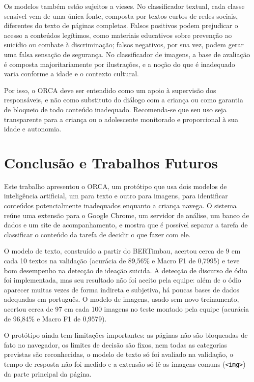\documentclass[
    12pt,           %
    oneside,        %
    a4paper,        %
    chapter=TITLE,  %
    english,        %
    brazil          %
]{abntex2}
\begin{document}
Os modelos também estão sujeitos a vieses. No classificador textual, cada
classe sensível vem de uma única fonte, composta por textos curtos de redes
sociais, diferentes do texto de páginas completas. Falsos positivos podem
prejudicar o acesso a conteúdos legítimos, como materiais educativos sobre
prevenção ao suicídio ou combate à discriminação; falsos negativos, por sua
vez, podem gerar uma falsa sensação de segurança. No classificador de imagens,
a base de avaliação é composta majoritariamente por ilustrações, e a noção do
que é inadequado varia conforme a idade e o contexto cultural.

Por isso, o ORCA deve ser entendido como um apoio à supervisão dos
responsáveis, e não como substituto do diálogo com a criança ou como garantia
de bloqueio de todo conteúdo inadequado. Recomenda-se que seu uso seja
transparente para a criança ou o adolescente monitorado e proporcional à sua
idade e autonomia.

\chapter{Conclusão e Trabalhos Futuros}
\label{cap:conclusao}

Este trabalho apresentou o ORCA, um protótipo que usa dois modelos de
inteligência artificial, um para texto e outro para imagens, para identificar
conteúdos potencialmente inadequados enquanto a criança navega. O sistema
reúne uma extensão para o Google Chrome, um servidor de análise, um banco de
dados e um site de acompanhamento, e mostra que é possível separar a tarefa de
classificar o conteúdo da tarefa de decidir o que fazer com ele.

O modelo de texto, construído a partir do BERTimbau, acertou cerca de 9 em
cada 10 textos na validação (acurácia de 89,56\% e Macro F1 de 0,7995) e teve
bom desempenho na detecção de ideação suicida. A detecção de discurso de ódio
foi implementada, mas seu resultado não foi aceito pela equipe: além de o ódio
aparecer muitas vezes de forma indireta e subjetiva, há poucas bases de dados
adequadas em português. O modelo de imagens, usado sem novo treinamento,
acertou cerca de 97 em cada 100 imagens no teste montado pela equipe
(acurácia de 96,84\% e Macro F1 de 0,9579).

O protótipo ainda tem limitações importantes: as páginas não são bloqueadas
de fato no navegador, os limites de decisão são fixos, nem todas as
categorias previstas são reconhecidas, o modelo de texto só foi avaliado na
validação, o tempo de resposta não foi medido e a extensão só lê as imagens
comuns (\texttt{<img>}) da parte principal da página.
\end{document}
